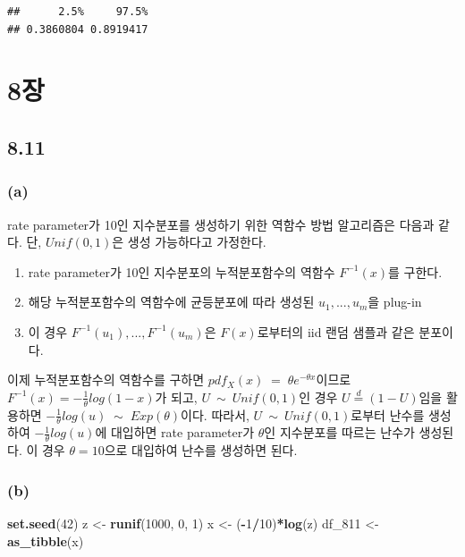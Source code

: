 \documentclass[
]{article}
\newenvironment{Shaded}{\begin{snugshade}}{\end{snugshade}}
\newcommand{\DecValTok}[1]{\textcolor[rgb]{0.00,0.00,0.81}{#1}}
\newcommand{\FunctionTok}[1]{\textcolor[rgb]{0.13,0.29,0.53}{\textbf{#1}}}
\newcommand{\NormalTok}[1]{#1}
\newcommand{\OtherTok}[1]{\textcolor[rgb]{0.56,0.35,0.01}{#1}}
\newcommand{\SpecialCharTok}[1]{\textcolor[rgb]{0.81,0.36,0.00}{\textbf{#1}}}
\providecommand{\tightlist}{%
  \setlength{\itemsep}{0pt}\setlength{\parskip}{0pt}}
\begin{document}
\begin{verbatim}
##      2.5%     97.5% 
## 0.3860804 0.8919417
\end{verbatim}

\section{8장}\label{uxc7a5-1}

\subsection{8.11}\label{section-4}

\subsubsection{(a)}\label{a}

rate parameter가 10인 지수분포를 생성하기 위한 역함수 방법 알고리즘은
다음과 같다. 단, \(Unif(0,1)\)은 생성 가능하다고 가정한다.

\begin{enumerate}
\def\labelenumi{(\arabic{enumi})}
\tightlist
\item
  rate parameter가 10인 지수분포의 누적분포함수의 역함수 \(F^{-1}(x)\)를
  구한다.
\item
  해당 누적분포함수의 역함수에 균등분포에 따라 생성된
  \(u_1, ..., u_m\)을 plug-in
\item
  이 경우 \(F^{-1}(u_1), ..., F^{-1}(u_m)\)은 \(F(x)\)로부터의 iid 랜덤
  샘플과 같은 분포이다.
\end{enumerate}

이제 누적분포함수의 역함수를 구하면
\(pdf_X(x)\;=\;\theta e^{-\theta x}\)이므로
\(F^{-1}(x) = -\frac{1}{\theta}log(1-x)\)가 되고,
\(U~{\sim}~Unif(0,1)\)인 경우 \(U \stackrel{d} = (1-U)\)임을 활용하면
\(-\frac{1}{\theta}log(u) \;{\sim}\; Exp(\theta)\)이다. 따라서,
\(U~{\sim}~Unif(0,1)\)로부터 난수를 생성하여
\(-\frac{1}{\theta}log(u)\)에 대입하면 rate parameter가 \(\theta\)인
지수분포를 따르는 난수가 생성된다. 이 경우 \(\theta = 10\)으로 대입하여
난수를 생성하면 된다.

\subsubsection{(b)}\label{b}

\begin{Shaded}
\begin{Highlighting}[]
\FunctionTok{set.seed}\NormalTok{(}\DecValTok{42}\NormalTok{)}
\NormalTok{z }\OtherTok{\textless{}{-}} \FunctionTok{runif}\NormalTok{(}\DecValTok{1000}\NormalTok{, }\DecValTok{0}\NormalTok{, }\DecValTok{1}\NormalTok{)}
\NormalTok{x }\OtherTok{\textless{}{-}}\NormalTok{ (}\SpecialCharTok{{-}}\DecValTok{1}\SpecialCharTok{/}\DecValTok{10}\NormalTok{)}\SpecialCharTok{*}\FunctionTok{log}\NormalTok{(z)}
\NormalTok{df\_811 }\OtherTok{\textless{}{-}} \FunctionTok{as\_tibble}\NormalTok{(x)}
\end{Highlighting}
\end{Shaded}
\end{document}
